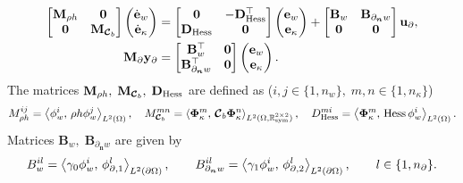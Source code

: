 \begin{equation}\label{eq:pHsys_findim_kirchh_hess}
\begin{aligned}
\begin{bmatrix}
\mathbf{M}_{\rho h} & \mathbf{0} \\
\mathbf{0} & \mathbf{M}_{\bm{\mathcal{C}}_b} \\
\end{bmatrix}
\begin{pmatrix}
\dot{\mathbf{e}}_{w} \\
\dot{\mathbf{e}}_{\kappa} \\
\end{pmatrix}
&= \begin{bmatrix}
\mathbf{0} & -\mathbf{D}_{\Hess}^\top \\
\mathbf{D}_{\Hess} & \mathbf{0} \\
\end{bmatrix} 
\begin{pmatrix}
\mathbf{e}_{w} \\
\mathbf{e}_{\kappa} \\
\end{pmatrix} + 
\begin{bmatrix}
\mathbf{B}_w & \mathbf{B}_{\partial_{\bm{n}} w}\\
\mathbf{0} & \mathbf{0}\\
\end{bmatrix}
\mathbf{u}_\partial, \\
\mathbf{M}_\partial {\mathbf{y}_\partial} &= \begin{bmatrix}
\mathbf{B}_w^\top & \mathbf{0} \\
\mathbf{B}_{\partial_{\bm{n}} w}^\top & \mathbf{0} \\
\end{bmatrix}\begin{pmatrix}
\mathbf{e}_{w} \\
\mathbf{e}_{\kappa} \\
\end{pmatrix}.
\end{aligned}
\end{equation}
The matrices $\mathbf{M}_{\rho h}, \; \mathbf{M}_{\bm{\mathcal{C}}_b}, \; 
\mathbf{D}_{\Hess}$ are defined as ($i, j \in \{1, n_w\}, \; m, n \in \{1, n_\kappa\}$)
\begin{equation}
M_{\rho h}^{ij} = \inner[L^2(\Omega)]{\phi_w^i}{\rho h \phi_w^j}, \quad
M_{\bm{\mathcal{C}}_b}^{mn} = \inner[L^2(\Omega, \mathbb{R}^{2\times 2}_{\text{sym}})]{\bm\Phi_\kappa^m}{\bm{\mathcal{C}}_b \bm\Phi_\kappa^n}, \quad D_{\Hess}^{mi} = \inner[L^2(\Omega)]{\bm\Phi_\kappa^m}{\Hess \phi_w^i}.
\end{equation}
Matrices $\mathbf{B}_w, \; \mathbf{B}_{\partial_{\bm{n}} w}$ are given by
\begin{equation}
{B}_w^{il} = \inner[L^2(\partial\Omega)]{\gamma_0 \phi_w^i}{\phi_{\partial, 1}^l}, \qquad {B}_{\partial_{\bm{n}} w}^{il} = \inner[L^2(\partial\Omega)]{\gamma_1 \phi_w^i}{\phi_{\partial, 2}^l}, \qquad l \in \{1, n_\partial\}.
\end{equation}

